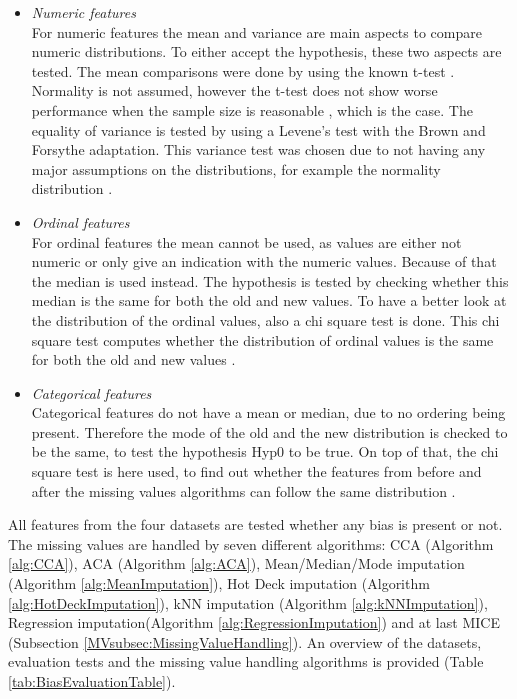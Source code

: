 \documentclass[10pt,a4paper]{report}
\begin{document}
	\begin{itemize}
		\item \textit{Numeric features} \\
		For numeric features the mean and variance are main aspects to compare numeric distributions. To either accept the hypothesis, these two aspects are tested. The mean comparisons were done by using the known t-test \cite{heiberger2004statistical}. Normality is not assumed, however the t-test does not show worse performance when the sample size is reasonable \cite{bartlett1935effect}, which is the case. The equality of variance is tested by using a Levene's test with the Brown and Forsythe adaptation. This variance test was chosen due to not having any major assumptions on the distributions, for example the normality distribution \cite{brown1974robust}.
		\item \textit{Ordinal features} \\
		For ordinal features the mean cannot be used, as values are either not numeric or only give an indication with the numeric values. Because of that the median is used instead. The hypothesis is tested by checking whether this median is the same for both the old and new values. To have a better look at the distribution of the ordinal values, also a chi square test is done. This chi square test computes whether the distribution of ordinal values is the same for both the old and new values \cite{satorra2001scaled}.
		\item \textit{Categorical features} \\
		Categorical features do not have a mean or median, due to no ordering being present. Therefore the mode of the old and the new distribution is checked to be the same, to test the hypothesis Hyp0 to be true. On top of that, the chi square test is here used, to find out whether the features from before and after the missing values algorithms can follow the same distribution \cite{satorra2001scaled}.
	\end{itemize}
	
	All features from the four datasets are tested whether any bias is present or not. The missing values are handled by seven different algorithms: CCA (Algorithm \ref{alg:CCA}), ACA (Algorithm \ref{alg:ACA}), Mean/Median/Mode imputation (Algorithm \ref{alg:MeanImputation}), Hot Deck imputation (Algorithm \ref{alg:HotDeckImputation}), kNN imputation (Algorithm \ref{alg:kNNImputation}), Regression imputation(Algorithm \ref{alg:RegressionImputation}) and at last MICE (Subsection \ref{MVsubsec:MissingValueHandling}). An overview of the datasets, evaluation tests and the missing value handling algorithms is provided (Table \ref{tab:BiasEvaluationTable}).
	
\end{document}

